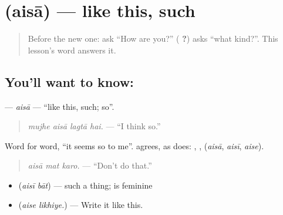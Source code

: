 \section[\texorpdfstring{\hi{ऐसा} (aisā)}{ऐसा (aisā)}]{ (aisā) — like this, such}

\label{lesson:HI-C280-aisa}



\begin{quote}
Before the new one: ask \textquotedblleft{}How are you?\textquotedblright{} (\textbf{  ?}) \textbf{} asks \textquotedblleft{}what kind?\textquotedblright{}. This lesson's word answers it.
\end{quote}

\subsection*{You'll want to know: }
\textbf{} — \emph{aisā} — \textquotedblleft{}like this, such; so\textquotedblright{}.

\begin{quote}
\textbf{   }
\end{quote}

\begin{quote}
\emph{mujhe aisā lagtā hai.} — \textquotedblleft{}I think so.\textquotedblright{}
\end{quote}

Word for word, \textquotedblleft{}it seems so to me\textquotedblright{}. \textbf{} agrees, as \textbf{} does: \textbf{}, \textbf{}, \textbf{} (\emph{aisā}, \emph{aisī}, \emph{aise}).

\begin{quote}
\textbf{  }
\end{quote}

\begin{quote}
\emph{aisā mat karo.} — \textquotedblleft{}Don't do that.\textquotedblright{}
\end{quote}

\begin{itemize}
\raggedright
  \item \textbf{ } (\emph{aisī bāt}) — such a thing; \textbf{} is feminine
  \item \textbf{ } (\emph{aise likhiye.}) — Write it like this.
\end{itemize}

